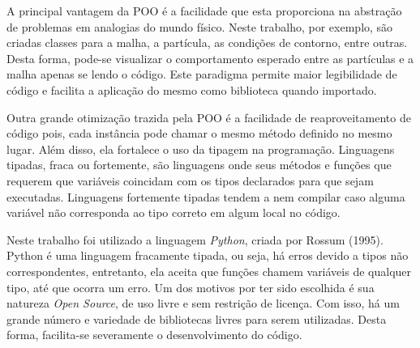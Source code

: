 A principal vantagem da POO é a facilidade que esta proporciona na abstração de problemas em analogias do mundo físico.
Neste trabalho, por exemplo, são criadas classes para a malha, a partícula, as condições de contorno, entre outras.
Desta forma, pode-se visualizar o comportamento esperado entre as partículas e a malha apenas se lendo o código.
Este paradigma permite maior legibilidade de código e facilita a aplicação do mesmo como biblioteca quando importado.

Outra grande otimização trazida pela POO é a facilidade de reaproveitamento de código pois, cada instância pode chamar o mesmo método definido no mesmo lugar.
Além disso, ela fortalece o uso da tipagem na programação.
Linguagens tipadas, fraca ou fortemente, são linguagens onde seus métodos e funções que requerem que variáveis coincidam com os tipos declarados para que sejam executadas.
Linguagens fortemente tipadas tendem a nem compilar caso alguma variável não corresponda ao tipo correto em algum local no código.

Neste trabalho foi utilizado a linguagem \textit{Python}, criada por Rossum (1995)\cite{python}.
Python é uma linguagem fracamente tipada, ou seja, há erros devido a tipos não correspondentes, entretanto, ela aceita que funções chamem variáveis de qualquer tipo, até que ocorra um erro.
Um dos motivos por ter sido escolhida é sua natureza \textit{Open Source}, de uso livre e sem restrição de licença.
Com isso, há um grande número e variedade de bibliotecas livres para serem utilizadas.
Desta forma, facilita-se severamente o desenvolvimento do código.
